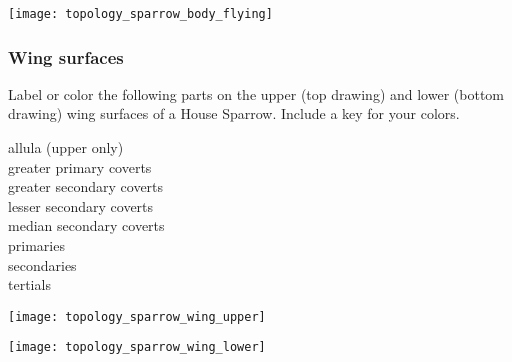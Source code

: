 \documentclass[10pt]{article}
\begin{document}
\vspace{\baselineskip}

\begin{center}
\texttt{[image: topology\_sparrow\_body\_flying]}
\end{center}

\newpage

\subsubsection*{Wing surfaces}

Label or color the following parts on the upper (top drawing) and lower (bottom drawing) wing surfaces of a House Sparrow. Include a key for your colors.


\begin{multicols}{3}
allula (upper only)\\
greater primary coverts\\
greater secondary coverts\\
lesser secondary coverts\\
median secondary coverts\\
primaries\\
secondaries\\
tertials
\end{multicols}

\vspace{\baselineskip}

\begin{center}
\texttt{[image: topology\_sparrow\_wing\_upper]}

\vspace{0.5in}

\texttt{[image: topology\_sparrow\_wing\_lower]}

\end{center}

%
%
%
%
%
%
\end{document}
